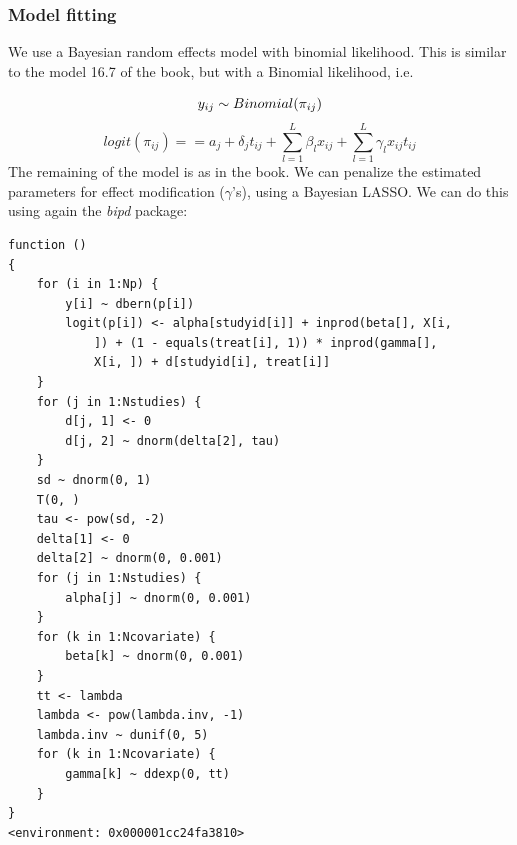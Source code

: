 \documentclass[
  letterpaper,
  DIV=11,
  numbers=noendperiod]{scrreprt}
\newenvironment{Shaded}{\begin{snugshade}}{\end{snugshade}}
\newcommand{\AttributeTok}[1]{\textcolor[rgb]{0.40,0.45,0.13}{#1}}
\newcommand{\DecValTok}[1]{\textcolor[rgb]{0.68,0.00,0.00}{#1}}
\newcommand{\FunctionTok}[1]{\textcolor[rgb]{0.28,0.35,0.67}{#1}}
\newcommand{\NormalTok}[1]{\textcolor[rgb]{0.00,0.23,0.31}{#1}}
\newcommand{\OtherTok}[1]{\textcolor[rgb]{0.00,0.23,0.31}{#1}}
\newcommand{\SpecialCharTok}[1]{\textcolor[rgb]{0.37,0.37,0.37}{#1}}
\newcommand{\StringTok}[1]{\textcolor[rgb]{0.13,0.47,0.30}{#1}}
\begin{document}
\hypertarget{model-fitting-1}{%
\subsubsection{Model fitting}\label{model-fitting-1}}

We use a Bayesian random effects model with binomial likelihood. This is
similar to the model 16.7 of the book, but with a Binomial likelihood,
i.e.~

\[ 
y_{ij}\sim Binomial(\pi_{ij}) \\
\] \[ 
logit(\pi_{ij})==a_j+\delta_j t_{ij}+ \sum_{l=1}^{L}\beta_l x_{ij}+ \sum_{l=1}^{L}\gamma_l x_{ij} t_{ij}
\] The remaining of the model is as in the book. We can penalize the
estimated parameters for effect modification (\(\gamma\)'s), using a
Bayesian LASSO. We can do this using again the \emph{bipd} package:

\begin{Shaded}
\end{Shaded}

\begin{verbatim}
function () 
{
    for (i in 1:Np) {
        y[i] ~ dbern(p[i])
        logit(p[i]) <- alpha[studyid[i]] + inprod(beta[], X[i, 
            ]) + (1 - equals(treat[i], 1)) * inprod(gamma[], 
            X[i, ]) + d[studyid[i], treat[i]]
    }
    for (j in 1:Nstudies) {
        d[j, 1] <- 0
        d[j, 2] ~ dnorm(delta[2], tau)
    }
    sd ~ dnorm(0, 1)
    T(0, )
    tau <- pow(sd, -2)
    delta[1] <- 0
    delta[2] ~ dnorm(0, 0.001)
    for (j in 1:Nstudies) {
        alpha[j] ~ dnorm(0, 0.001)
    }
    for (k in 1:Ncovariate) {
        beta[k] ~ dnorm(0, 0.001)
    }
    tt <- lambda
    lambda <- pow(lambda.inv, -1)
    lambda.inv ~ dunif(0, 5)
    for (k in 1:Ncovariate) {
        gamma[k] ~ ddexp(0, tt)
    }
}
<environment: 0x000001cc24fa3810>
\end{verbatim}
\end{document}
